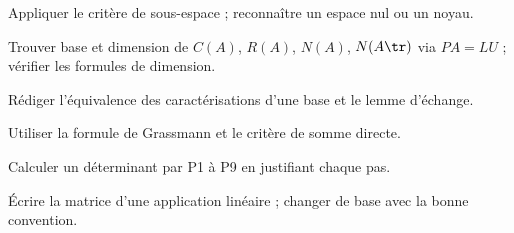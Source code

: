 \begin{bilan}
\item Appliquer le critère de sous-espace ; reconnaître un espace nul ou un noyau.
\item Trouver base et dimension de $C(A)$, $R(A)$, $N(A)$, $N(A\tr)$ via $PA=LU$ ; vérifier les formules de dimension.
\item Rédiger l'équivalence des caractérisations d'une base et le lemme d'échange.
\item Utiliser la formule de Grassmann et le critère de somme directe.
\item Calculer un déterminant par P1 à P9 en justifiant chaque pas.
\item Écrire la matrice d'une application linéaire ; changer de base avec la bonne convention.
\end{bilan}
